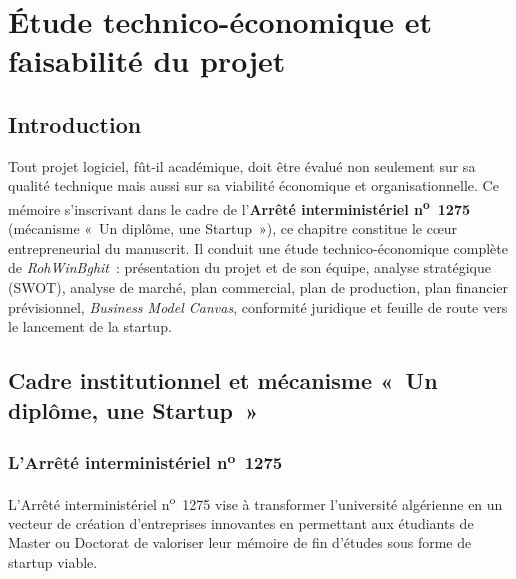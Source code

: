 \chapter{Étude technico-économique et faisabilité du projet}
\label{chap:business}

\section*{Introduction}

Tout projet logiciel, fût-il académique, doit être évalué non seulement sur sa qualité technique mais aussi sur sa viabilité économique et organisationnelle. Ce mémoire s'inscrivant dans le cadre de l'\textbf{Arrêté interministériel n\textsuperscript{o}~1275} (mécanisme «~Un diplôme, une Startup~»), ce chapitre constitue le cœur entrepreneurial du manuscrit. Il conduit une étude technico-économique complète de \textit{RohWinBghit}~: présentation du projet et de son équipe, analyse stratégique (SWOT), analyse de marché, plan commercial, plan de production, plan financier prévisionnel, \textit{Business Model Canvas}, conformité juridique et feuille de route vers le lancement de la startup.

\section{Cadre institutionnel et mécanisme «~Un diplôme, une Startup~»}
\label{sec:arrete1275}

\subsection{L'Arrêté interministériel n\textsuperscript{o}~1275}

L'Arrêté interministériel n\textsuperscript{o}~1275 vise à transformer l'université algérienne en un vecteur de création d'entreprises innovantes en permettant aux étudiants de Master ou Doctorat de valoriser leur mémoire de fin d'études sous forme de startup viable.

